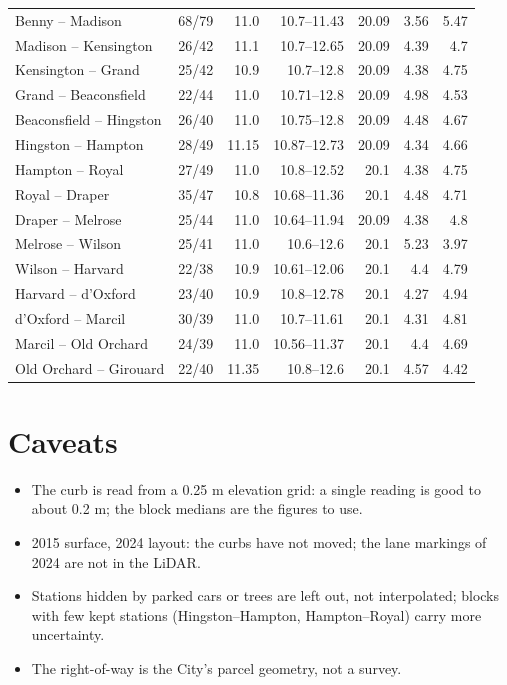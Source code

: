 \documentclass[11pt,a4paper]{article}
\begin{document}
{\begin{longtable}{@{}lrrrrrr@{}}
Benny -- Madison & 68/79 & 11.0 & 10.7--11.43 & 20.09 & 3.56 & 5.47 \\
Madison -- Kensington & 26/42 & 11.1 & 10.7--12.65 & 20.09 & 4.39 & 4.7 \\
Kensington -- Grand & 25/42 & 10.9 & 10.7--12.8 & 20.09 & 4.38 & 4.75 \\
Grand -- Beaconsfield & 22/44 & 11.0 & 10.71--12.8 & 20.09 & 4.98 & 4.53 \\
Beaconsfield -- Hingston & 26/40 & 11.0 & 10.75--12.8 & 20.09 & 4.48 & 4.67 \\
Hingston -- Hampton & 28/49 & 11.15 & 10.87--12.73 & 20.09 & 4.34 & 4.66 \\
Hampton -- Royal & 27/49 & 11.0 & 10.8--12.52 & 20.1 & 4.38 & 4.75 \\
Royal -- Draper & 35/47 & 10.8 & 10.68--11.36 & 20.1 & 4.48 & 4.71 \\
Draper -- Melrose & 25/44 & 11.0 & 10.64--11.94 & 20.09 & 4.38 & 4.8 \\
Melrose -- Wilson & 25/41 & 11.0 & 10.6--12.6 & 20.1 & 5.23 & 3.97 \\
Wilson -- Harvard & 22/38 & 10.9 & 10.61--12.06 & 20.1 & 4.4 & 4.79 \\
Harvard -- d\textquoteright{}Oxford & 23/40 & 10.9 & 10.8--12.78 & 20.1 & 4.27 & 4.94 \\
d\textquoteright{}Oxford -- Marcil & 30/39 & 11.0 & 10.7--11.61 & 20.1 & 4.31 & 4.81 \\
Marcil -- Old Orchard & 24/39 & 11.0 & 10.56--11.37 & 20.1 & 4.4 & 4.69 \\
Old Orchard -- Girouard & 22/40 & 11.35 & 10.8--12.6 & 20.1 & 4.57 & 4.42 \\
\bottomrule\end{longtable}}

\section*{Caveats}
\begin{itemize}
\item The curb is read from a 0.25 m elevation grid: a single reading is good to about 0.2 m; the block medians are the figures to use.
\item 2015 surface, 2024 layout: the curbs have not moved; the lane markings of 2024 are not in the LiDAR.
\item Stations hidden by parked cars or trees are left out, not interpolated; blocks with few kept stations (Hingston--Hampton, Hampton--Royal) carry more uncertainty.
\item The right-of-way is the City\textquoteright{}s parcel geometry, not a survey.
\end{itemize}
\end{document}
